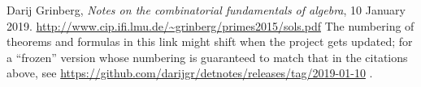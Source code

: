 \documentclass[paper=a4, fontsize=12pt]{scrartcl}%
\theoremstyle{plainsl}
\theoremstyle{definition}
\theoremstyle{remark}
\begin{document}
\begin{thebibliography}{99999999}                                                                                         %










Darij Grinberg, \textit{Notes on the combinatorial
fundamentals of algebra}, 10 January 2019. \newline%
\url{http://www.cip.ifi.lmu.de/~grinberg/primes2015/sols.pdf} \newline The
numbering of theorems and formulas in this link might shift when the project
gets updated; for a ``frozen'' version whose numbering is guaranteed to match
that in the citations above, see
\url{https://github.com/darijgr/detnotes/releases/tag/2019-01-10} .
\end{thebibliography}
\end{document}
